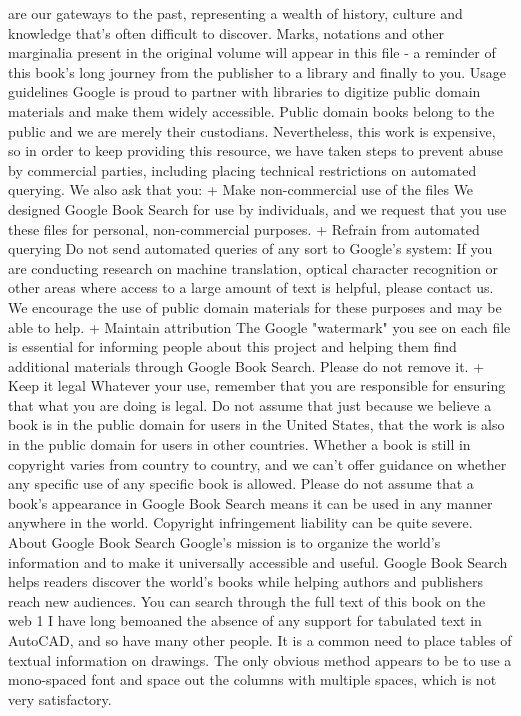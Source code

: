 \documentclass[a4paper]{article}
\begin{document}
are our gateways to the past, representing a wealth of history, culture and knowledge that's often difficult to discover. 
Marks, notations and other marginalia present in the original volume will appear in this file - a reminder of this book's long journey from the 
publisher to a library and finally to you. 
Usage guidelines 
Google is proud to partner with libraries to digitize public domain materials and make them widely accessible. Public domain books belong to the 
public and we are merely their custodians. Nevertheless, this work is expensive, so in order to keep providing this resource, we have taken steps to 
prevent abuse by commercial parties, including placing technical restrictions on automated querying. 
We also ask that you: 
+ Make non-commercial use of the files We designed Google Book Search for use by individuals, and we request that you use these files for 
personal, non-commercial purposes. 
+ Refrain from automated querying Do not send automated queries of any sort to Google's system: If you are conducting research on machine 
translation, optical character recognition or other areas where access to a large amount of text is helpful, please contact us. We encourage the 
use of public domain materials for these purposes and may be able to help. 
+ Maintain attribution The Google "watermark" you see on each file is essential for informing people about this project and helping them find 
additional materials through Google Book Search. Please do not remove it. 
+ Keep it legal Whatever your use, remember that you are responsible for ensuring that what you are doing is legal. Do not assume that just 
because we believe a book is in the public domain for users in the United States, that the work is also in the public domain for users in other 
countries. Whether a book is still in copyright varies from country to country, and we can't offer guidance on whether any specific use of 
any specific book is allowed. Please do not assume that a book's appearance in Google Book Search means it can be used in any manner 
anywhere in the world. Copyright infringement liability can be quite severe. 
About Google Book Search 
Google's mission is to organize the world's information and to make it universally accessible and useful. Google Book Search helps readers 
discover the world's books while helping authors and publishers reach new audiences. You can search through the full text of this book on the web 1
I have long bemoaned the absence of any support for tabulated text in AutoCAD, and so have many other people. It is a common need to place tables of textual information on drawings. The only obvious method appears to be to use a mono-spaced font and space out the columns with multiple spaces, which is not very satisfactory.
\end{document}
